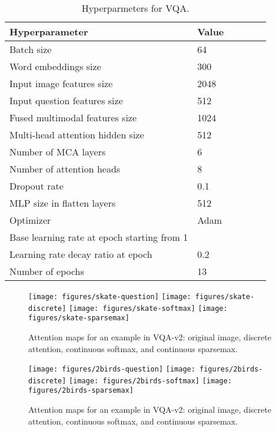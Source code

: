 \documentclass{article}
\begin{document}
\begin{table}[t]
    \caption{Hyperparmeters for VQA.}
    \label{tab:table_hyperparams_VQA}
    \begin{small}
    \begin{center}
    \begin{tabular}{llllll}
        \toprule
        \sc Hyperparameter & \sc Value  \\
        \midrule
        Batch size                  & 64    \\
        Word embeddings size        & 300     \\
        Input image features size   & 2048 \\
        Input question features size & 512 \\
        Fused multimodal features size & 1024 \\
        Multi-head attention hidden size        & 512 \\
Number of MCA layers        & 6 \\
        Number of attention heads   & 8 \\
        Dropout rate                & 0.1 \\
        MLP size in flatten layers  & 512 \\
        Optimizer                   & Adam \\
        Base learning rate at epoch  starting from 1 & \\
        Learning rate decay ratio at epoch   & 0.2 \\
        Number of epochs            & 13 \\
        
        \bottomrule
    \end{tabular}
    \end{center}
    \end{small}
\end{table}


\begin{figure*}[t]
\centering
\texttt{[image: figures/skate-question]}
\texttt{[image: figures/skate-discrete]}
\texttt{[image: figures/skate-softmax]}
\texttt{[image: figures/skate-sparsemax]}
\caption{\label{fig:examples_vqa_skate}Attention maps for an example in VQA-v2: original image, discrete attention, continuous softmax, and continuous sparsemax.}
\end{figure*}


\begin{figure*}[t]
\centering
\texttt{[image: figures/2birds-question]}
\texttt{[image: figures/2birds-discrete]}
\texttt{[image: figures/2birds-softmax]}
\texttt{[image: figures/2birds-sparsemax]}
\caption{\label{fig:examples_vqa_2birds}Attention maps for an example in VQA-v2: original image, discrete attention, continuous softmax, and continuous sparsemax.}
\end{figure*}
\end{document}
